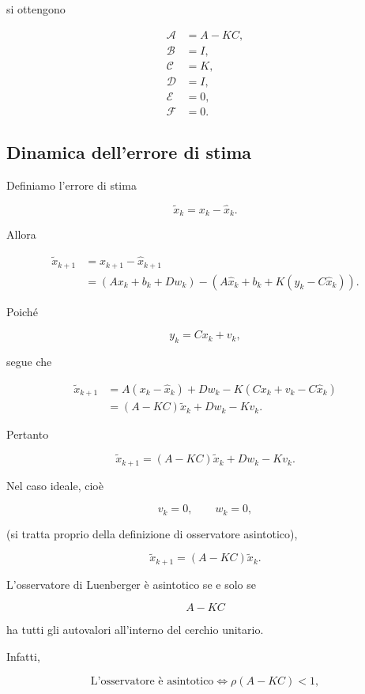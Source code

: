 \documentclass[11pt,a4paper]{article}
\begin{document}
si ottengono

\[
\boxed{
\begin{aligned}
\mathcal{A}&=A-KC,\\
\mathcal{B}&=I,\\
\mathcal{C}&=K,\\
\mathcal{D}&=I,\\
\mathcal{E}&=0,\\
\mathcal{F}&=0.
\end{aligned}
}
\]

\subsection*{Dinamica dell'errore di stima}

Definiamo l'errore di stima

\[
\tilde{x}_k=x_k-\hat{x}_k.
\]

Allora

\[
\begin{aligned}
\tilde{x}_{k+1}
&=
x_{k+1}-\hat{x}_{k+1}\\
&=
\left(Ax_k+b_k+Dw_k\right)
-
\left(A\hat{x}_k+b_k+K(y_k-C\hat{x}_k)\right).
\end{aligned}
\]

Poiché

\[
y_k=Cx_k+v_k,
\]

segue che

\[
\begin{aligned}
\tilde{x}_{k+1}
&=
A(x_k-\hat{x}_k)
+
Dw_k
-
K(Cx_k+v_k-C\hat{x}_k)\\
&=
(A-KC)\tilde{x}_k
+
Dw_k
-
Kv_k.
\end{aligned}
\]

Pertanto

\[
\boxed{
\tilde{x}_{k+1}
=
(A-KC)\tilde{x}_k
+
Dw_k
-
Kv_k.
}
\]

Nel caso ideale, cioè

\[
v_k=0,
\qquad
w_k=0,
\]

(si tratta proprio della definizione di osservatore asintotico),

\[
\boxed{
\tilde{x}_{k+1}
=
(A-KC)\tilde{x}_k.
}
\]

L'osservatore di Luenberger è asintotico se e solo se

\[
A-KC
\]

ha tutti gli autovalori all'interno del cerchio unitario.

Infatti,

\[
\boxed{
\text{L'osservatore è asintotico}
\iff
\rho(A-KC)<1,
}
\]
\end{document}
